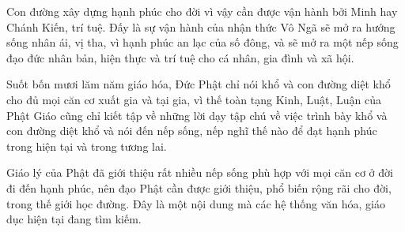 Con đường xây dựng hạnh phúc cho đời vì vậy cần được vận hành bởi Minh hay Chánh Kiến, trí tuệ. Đấy là sự vận hành của nhận thức Vô Ngã sẽ mở ra hướng sống nhân ái, vị tha, vì hạnh phúc an lạc của số đông, và sẽ mở ra một nếp sống đạo đức nhân bản, hiện thực và trí tuệ cho cá nhân, gia đình và xã hội.

Suốt bốn mươi lăm năm giáo hóa, Đức Phật chỉ nói khổ và con đường diệt khổ cho đủ mọi căn cơ xuất gia và tại gia, vì thế toàn tạng Kinh, Luật, Luận của Phật Giáo cũng chỉ kiết tập về những lời dạy tập chú về việc trình bày khổ và con đường diệt khổ và nói đến nếp sống, nếp nghĩ thế nào để đạt hạnh phúc trong hiện tại và trong tương lai.

Giáo lý của Phật đã giới thiệu rất nhiều nếp sống phù hợp với mọi căn cơ ở đời đi đến hạnh phúc, nên đạo Phật cần được giới thiệu, phổ biến rộng rãi cho đời, trong thế giới học đường. Đây là một nội dung mà các hệ thống văn hóa, giáo dục hiện tại đang tìm kiếm.

